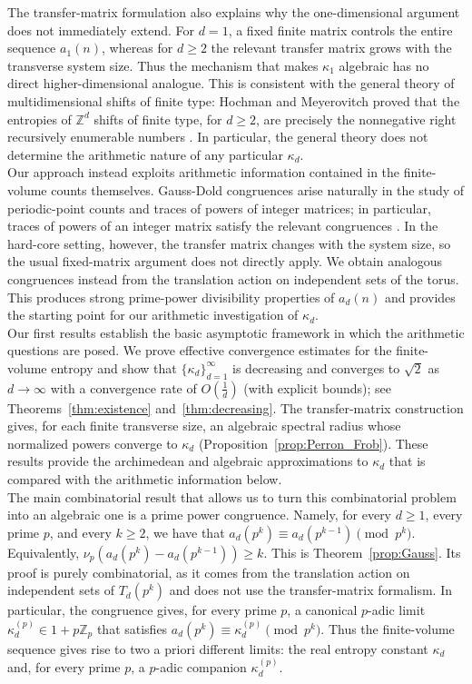 \documentclass{article}
\theoremstyle{plain}
\theoremstyle{definition}
\theoremstyle{remark}
\begin{document}
The transfer-matrix formulation also explains why the one-dimensional
argument does not immediately extend. For $d=1$, a fixed finite matrix
controls the entire sequence $a_1(n)$, whereas for $d\geq2$ the relevant
transfer matrix grows with the transverse system size. Thus the mechanism
that makes $\kappa_1$ algebraic has no direct higher-dimensional analogue.
This is consistent with the general theory of multidimensional shifts of
finite type: Hochman and Meyerovitch proved that the entropies of
$\mathbb Z^d$ shifts of finite type, for $d\geq2$, are precisely the
nonnegative right recursively enumerable numbers \cite{HM2010}. In
particular, the general theory does not determine the arithmetic nature of
any particular $\kappa_d$.\\

Our approach instead exploits arithmetic information contained in the
finite-volume counts themselves. Gauss-Dold congruences arise naturally in
the study of periodic-point counts and traces of powers of integer matrices;
in particular, traces of powers of an integer matrix satisfy the relevant
congruences \cite{Arnold2006,Zarelua2008}. In the hard-core setting, however,
the transfer matrix changes with the system size, so the usual fixed-matrix
argument does not directly apply. We obtain analogous congruences instead
from the translation action on independent sets of the torus. This produces
strong prime-power divisibility properties of $a_d(n)$ and provides the
starting point for our arithmetic investigation of $\kappa_d$.\\

Our first results establish the basic asymptotic framework in which the
arithmetic questions are posed. We prove effective convergence estimates for
the finite-volume entropy and show that $\{\kappa_d\}_{d=1}^\infty$ is decreasing
and converges to $\sqrt2$ as $d\to\infty$ with a convergence rate of $O(\frac{1}{d})$ (with explicit bounds); see
Theorems~\ref{thm:existence} and~\ref{thm:decreasing}. The transfer-matrix
construction gives, for each finite transverse size, an algebraic spectral
radius whose normalized powers converge to $\kappa_d$
(Proposition~\ref{prop:Perron_Frob}). These results provide the
archimedean and algebraic approximations to $\kappa_d$ that is compared
with the arithmetic information below.\\

The main combinatorial result that allows us to turn this combinatorial problem into an algebraic one is a prime power congruence. Namely, for every $d\geq1$, every prime $p$, and every $k\geq2$, we have that $a_d(p^k)\equiv a_d(p^{k-1})\pmod{p^k}$. 
Equivalently, $\nu_p\!\left(a_d(p^k)-a_d(p^{k-1})\right)\geq k$. This is Theorem~\ref{prop:Gauss}. Its proof is purely combinatorial, as it
comes from the translation action on independent sets of $T_d(p^k)$ and
does not use the transfer-matrix formalism. In particular, the congruence
gives, for every prime $p$, a canonical $p$-adic limit $\kappa_d^{(p)}\in1+p\mathbb Z_p$ that satisfies $a_d(p^k)\equiv\kappa_d^{(p)}\pmod{p^k}$. Thus the finite-volume sequence gives rise to two a priori different
limits: the real entropy constant $\kappa_d$ and, for every prime $p$, a
$p$-adic companion $\kappa_d^{(p)}$.\\
\end{document}
